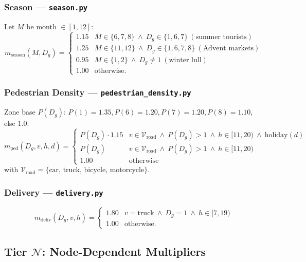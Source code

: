 \documentclass[12pt,a4paper]{article}
\begin{document}
\subsubsection{Season — \texttt{season.py}}
Let $M$ be month $\in[1,12]$:
\[
m_{\text{season}}(M,D_g) =
\begin{cases}
1.15 & M\in\{6,7,8\}\ \land\ D_g\in\{1,6,7\}\ (\text{summer tourists}) \\
1.25 & M\in\{11,12\}\ \land\ D_g\in\{1,6,7,8\}\ (\text{Advent markets}) \\
0.95 & M\in\{1,2\}\ \land\ D_g\ne 1\ (\text{winter lull}) \\
1.00 & \text{otherwise.}
\end{cases}
\]

\subsubsection{Pedestrian Density — \texttt{pedestrian\_density.py}}
Zone base $P(D_g)$: $P(1)=1.35, P(6)=1.20, P(7)=1.20, P(8)=1.10$, else $1.0$.
\[
m_{\text{ped}}(D_g,v,h,d) =
\begin{cases}
P(D_g) \cdot 1.15 & v\in\mathcal{V}_{\text{road}}\ \land\ P(D_g)>1\ \land\ h\in[11,20)\ \land\ \mathrm{holiday}(d) \\
P(D_g)            & v\in\mathcal{V}_{\text{road}}\ \land\ P(D_g)>1\ \land\ h\in[11,20) \\
1.00              & \text{otherwise}
\end{cases}
\]
with $\mathcal{V}_{\text{road}} = \{\text{car, truck, bicycle, motorcycle}\}$.

\subsubsection{Delivery — \texttt{delivery.py}}
\[
m_{\text{deliv}}(D_g,v,h) =
\begin{cases}
1.80 & v=\text{truck}\ \land\ D_g=1\ \land\ h\in[7,19) \\
1.00 & \text{otherwise.}
\end{cases}
\]

\subsection{Tier $\mathcal{N}$: Node-Dependent Multipliers}
\end{document}
